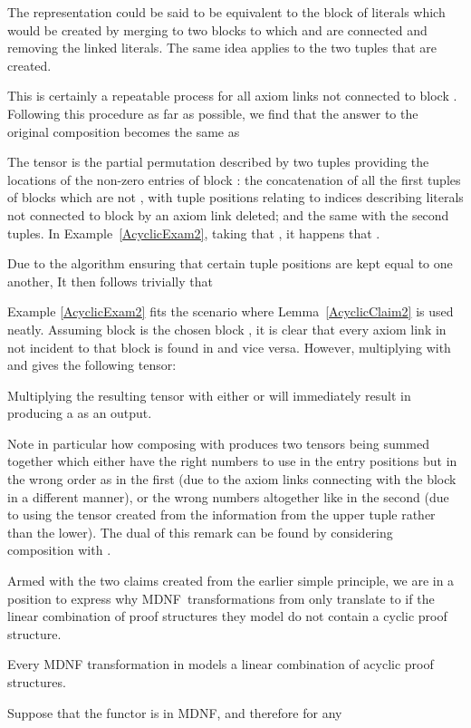 \documentclass{LMCS}
\theoremstyle{plain}\newtheorem*{cLm}{Claim}
\newcommand{\p}{} \newcommand{\N}{\mathbb{N}}
\begin{document}
The representation could be said to be equivalent to the block of literals which would be created by merging to two blocks to which  and  are connected and removing the linked literals. The same idea applies to the two tuples that are created.

\p This is certainly a repeatable process for all axiom links not connected to block . Following this procedure as far as possible, we find that the answer to the original composition becomes the same as

The tensor  is the partial permutation described by two tuples providing the locations of the non-zero entries of block : the concatenation of all the first tuples of blocks which are not , with tuple positions relating to indices describing literals not connected to block  by an axiom link deleted; and the same with the second tuples. In Example~\ref{AcyclicExam2}, taking that , it happens that .

\p Due to the algorithm ensuring that certain tuple positions are kept
equal to one another, 
 It then follows trivially that 
 \medskip

\noindent Example \ref{AcyclicExam2} fits the scenario where Lemma~\ref{AcyclicClaim2} is used neatly. Assuming block  is the chosen block , it is clear that every axiom link in  not incident to that block is found in  and vice versa. However, multiplying  with  and  gives the following tensor:
 

\p\noindent Multiplying the resulting tensor with either  or  will immediately result in producing a  as an output.


Note in particular how composing with  produces two tensors being summed together which either have the right numbers to use in the entry positions but in the wrong order as in the first (due to the axiom links connecting with the block in a different manner), or the wrong numbers altogether like in the second (due to using the tensor created from the information from the upper tuple rather than the lower). The dual of this remark can be found by considering composition with .

\p Armed with the two claims created from the earlier simple principle, we are in a position to express why MDNF~transformations from  only translate to  if the linear combination of proof structures they model do not contain a cyclic proof structure.

\begin{prop} \label{AcyclicLemma} Every MDNF transformation in 
  models a linear combination of acyclic proof structures.
\end{prop}
\proof
  Suppose that the functor  is in MDNF, and therefore for
  any 
  
\end{document}
